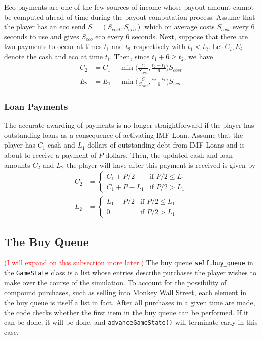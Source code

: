 \documentclass[12pt,letterpaper]{article}
\theoremstyle{remark}
\theoremstyle{plain}
\begin{document}
Eco payments are one of the few sources of income whose payout amount cannot be computed ahead of time during the payout computation process. Assume that the player has an eco send $S = (S_{cost}, S_{eco})$ which on average costs $S_{cost}$ every 6 seconds to use and gives $S_{eco}$ eco every $6$ seconds. Next, suppose that there are two payments to occur at times $t_1$ and $t_2$ respectively with $t_1 < t_2$. Let $C_i,E_i$ denote the cash and eco at time $t_i$. Then, since $t_1 + 6 \geq t_2$, we have
\begin{align}
    C_2 &= C_1 - \min\Big(\frac{C}{S_{cost}}, \frac{t_2-t_1}{6}\Big)S_{cost} \\
    E_2 &= E_1 + \min\Big(\frac{C}{S_{cost}}, \frac{t_2-t_1}{6}\Big)S_{eco}
\end{align}

\subsubsection{Loan Payments}

The accurate awarding of payments is no longer straightforward if the player has outstanding loans as a consequence of activating IMF Loan. Assume that the player has $C_1$ cash and $L_1$ dollars of outstanding debt from IMF Loans and is about to receive a payment of $P$ dollars. Then, the updated cash and loan amounts $C_2$ and $L_2$ the player will have after this payment is received is given by
\begin{align}\label{loan payment formula}
    C_2 &= \begin{cases}
    C_1 + P/2 & \text{if } P/2 \leq L_1 \\
    C_1 + P - L_1 & \text{if } P/2 > L_1
    \end{cases} \\
    L_2 &= \begin{cases}
    L_1 - P/2 & \text{if } P/2 \leq L_1 \\
    0 & \text{if } P/2 > L_1
    \end{cases}
\end{align}

\subsection{The Buy Queue}

\textcolor{red}{(I will expand on this subsection more later.)} The buy queue \texttt{self.buy\_queue} in the \texttt{GameState} class is a list whose entries describe purchases the player wishes to make over the course of the simulation. To account for the possibility of compound purchases, such as selling into Monkey Wall Street, each element in the buy queue is itself a list in fact. After all purchases in a given time are made, the code checks whether the first item in the buy queue can be performed. If it can be done, it will be done, and \texttt{advanceGameState()} will terminate early in this case.
\end{document}
